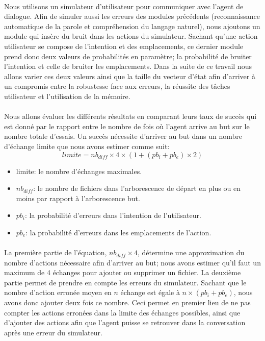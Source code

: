 \paragraph{}Nous utilisons un simulateur d'utilisateur pour communiquer avec l'agent de dialogue. Afin de simuler aussi les erreurs des modules précédents (reconnaissance automatique de la parole et compréhension du langage naturel), nous ajoutons un module qui insère du bruit dans les actions du simulateur. Sachant qu'une action utilisateur se compose de l'intention et des emplacements, ce dernier module prend donc deux valeurs de probabilités en paramètre; la probabilité de bruiter l'intention et celle de bruiter les emplacements. Dans la suite de ce travail nous allons varier ces deux valeurs ainsi que la taille du vecteur d'état afin d'arriver à un compromis entre la robustesse face aux erreurs, la réussite des tâches utilisateur et l'utilisation de la mémoire.
\paragraph{}Nous allons évaluer les différents résultats en comparant leurs taux de succès qui est donné par le rapport entre le nombre de fois où l'agent arrive au but sur le nombre totale d'essais. Un succès nécessite d'arriver au but dans un nombre d'échange limite que nous avons estimer comme suit: 
\[limite = nb_{diff} \times 4 \times (1 + (pb_i + pb_e) \times 2) \]
\begin{itemize}
	\item limite: le nombre d'échanges maximales.
	\item $nb_{diff}$: le nombre de fichiers dans l'arborescence de départ en plus ou en moins par rapport à l'arborescence but.
	\item $pb_i$: la probabilité d'erreurs dans l'intention de l'utilisateur.
	\item $pb_e$: la probabilité d'erreurs dans les emplacements de l'action.
\end{itemize}
\paragraph{}La première partie de l'équation, $nb_{diff} \times 4$, détermine une approximation du nombre d'actions nécessaire afin d'arriver au but; nous avons estimer qu'il faut un maximum de 4 échanges pour ajouter ou supprimer un fichier. La deuxième partie permet de prendre en compte les erreurs du simulateur. Sachant que le nombre d'action erronée moyen en $n$ échange est égale à $n \times (pb_i + pb_e)$, nous avons donc ajouter deux fois ce nombre. Ceci permet en premier lieu de ne pas compter les actions erronées dans la limite des échanges possibles, ainsi que d'ajouter des actions afin que l'agent puisse se retrouver dans la conversation après une erreur du simulateur.

